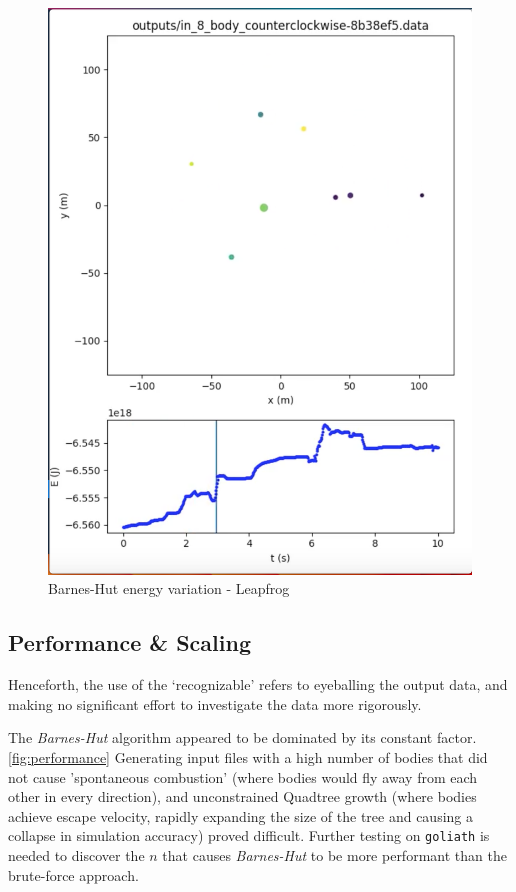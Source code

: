 \documentclass[11pt,a4paper]{article}
\begin{document}
\begin{figure}[b]
\caption{Barnes-Hut energy variation - Leapfrog}
\centering
\label{fig:barnes_hut}
\includegraphics[width=\textwidth]{barnes_hut}
\end{figure} 

\subsection*{Performance \& Scaling}

Henceforth, the use of the `recognizable' refers to eyeballing the output data, and making no significant effort to investigate the data more rigorously.

The \textit{Barnes-Hut} algorithm appeared to be dominated by its constant factor.\ref{fig:performance} Generating input files with a high number of bodies that did not cause 'spontaneous combustion' (where bodies would fly away from each other in every direction), and unconstrained Quadtree growth (where bodies achieve escape velocity, rapidly expanding the size of the tree and causing a collapse in simulation accuracy) proved difficult. Further testing on \texttt{goliath} is needed to discover the $n$ that causes \textit{Barnes-Hut} to be more performant than the brute-force approach.
\end{document}
